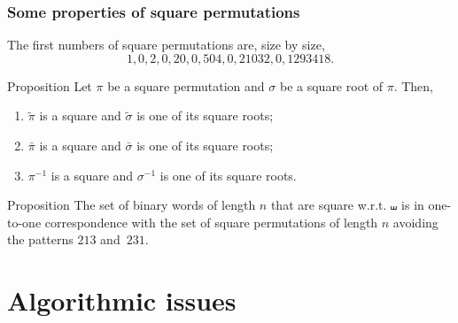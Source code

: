 \documentclass[unknownkeysallowed,10pt,xcolor={dvipsnames}]{beamer}
\begin{document}
\begin{frame} \frametitle{Some properties of square permutations}
The first numbers of square permutations are, size by size,
\begin{equation*}
    1, 0, 2, 0, 20, 0, 504, 0, 21032, 0, 1293418.
\end{equation*}

\begin{block}{Proposition}
    Let $\pi$ be a square permutation and $\sigma$ be a square root of
    $\pi$. Then,
    \begin{enumerate}
        \item $\widetilde{\pi}$ is a square and
        $\widetilde{\sigma}$ is one of its square roots;
        \smallskip

        \item $\bar \pi$ is a square and $\bar \sigma$ is one of
        its square roots;
        \smallskip

        \item $\pi^{-1}$ is a square and $\sigma^{-1}$ is one of
        its square roots.
    \end{enumerate}
\end{block}
\medskip

\begin{block}{Proposition}
    The set of binary words of length $n$ that are square w.r.t.
    $\shuffle$ is in one-to-one correspondence with the set of
    square permutations of length $n$ avoiding the patterns
    $213$ and~$231$.
\end{block}
\end{frame}

\section{Algorithmic issues}

\end{document}
